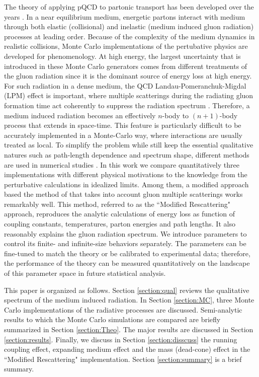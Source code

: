 \documentclass[aps, prc, reprint, amsmath, groupedaddress, nofootinbib]{revtex4-1}
\begin{document}
The theory of applying pQCD to partonic transport has been developed over the years \cite{Arnold:2002zm, Ghiglieri:2015ala}.
In a near equilibrium medium, energetic partons interact with medium through both elastic (collisional) and inelastic (medium induced gluon radiation) processes at leading order.
Because of the complexity of the medium dynamics in realistic collisions, Monte Carlo implementations of the pertubative physics are developed for phenomenology.
At high energy, the largest uncertainty that is introduced in these Monte Carlo generators comes from different treatments of the gluon radiation since it is the dominant source of energy loss at high energy.
For such radiation in a dense medium, the QCD Landau-Pomeranchuk-Migdal (LPM) effect is important, where multiple scatterings during the radiating gluon formation time act coherently to suppress the radiation spectrum \cite{PhysRev.103.1811,Wang:1994fx,Zakharov:1996fv,Baier:1996kr}.
Therefore, a medium induced radiation becomes an effectively $n$-body to $(n+1)$-body process that extends in space-time.
This feature is particularly difficult to be accurately implemented in a Monte-Carlo way, where interactions are usually treated as local.
To simplify the problem while still keep the essential qualitative natures such as path-length dependence and spectrum shape, different methods are used in numerical studies \cite{Djordjevic:2008iz,Cao:2013ita,ColemanSmith:2012vr,Xu:2004mz, Zapp:2011ya, Gossiaux:2012cv,Park:thesis}.
In this work we compare quantitatively three implementations with different physical motivations to the knowledge from the perturbative calculations in idealized limits.
Among them, a modified approach based the method of \cite{Zapp:2011ya} that takes into account gluon multiple scatterings works remarkably well.
This method, referred to as the ``Modified Rescattering" approach, reproduces the analytic calculations of energy loss as function of coupling constants, temperatures, parton energies and path lengths.
It also reasonably explains the gluon radiation spectrum.
We introduce parameters to control its finite- and infinite-size behaviors separately.
The parameters can be fine-tuned to match the theory or be calibrated to experimental data;
therefore, the performance of the theory can be measured quantitatively on the landscape of this parameter space in future statistical analysis.

This paper is organized as follows. Section \ref{section:qual} reviews the qualitative spectrum of the medium induced radiation.
In Section \ref{section:MC}, three Monte Carlo implementations of the radiative processes are discussed. 
Semi-analytic results to which the Monte Carlo simulations are compared are briefly summarized in Section \ref{section:Theo}.
The major results are discussed in Section \ref{section:results}.
Finally, we discuss in Section \ref{section:disscuss} the running coupling effect, expanding medium effect and the mass (dead-cone) effect in the ``Modified Rescattering" implementation. Section \ref{section:summary} is a brief summary.
\end{document}
